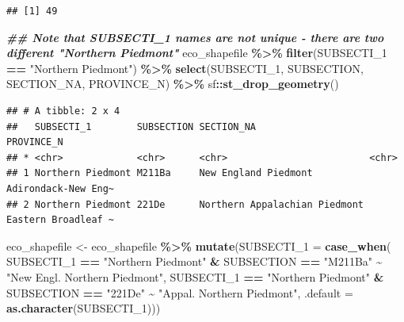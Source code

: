 \documentclass[
]{book}
\newenvironment{Shaded}{\begin{snugshade}}{\end{snugshade}}
\newcommand{\AttributeTok}[1]{\textcolor[rgb]{0.13,0.29,0.53}{#1}}
\newcommand{\DocumentationTok}[1]{\textcolor[rgb]{0.56,0.35,0.01}{\textbf{\textit{#1}}}}
\newcommand{\FunctionTok}[1]{\textcolor[rgb]{0.13,0.29,0.53}{\textbf{#1}}}
\newcommand{\NormalTok}[1]{#1}
\newcommand{\OtherTok}[1]{\textcolor[rgb]{0.56,0.35,0.01}{#1}}
\newcommand{\SpecialCharTok}[1]{\textcolor[rgb]{0.81,0.36,0.00}{\textbf{#1}}}
\newcommand{\StringTok}[1]{\textcolor[rgb]{0.31,0.60,0.02}{#1}}
\begin{document}
\begin{Shaded}
\end{Shaded}

\begin{verbatim}
## [1] 49
\end{verbatim}

\begin{Shaded}
\begin{Highlighting}[]
\DocumentationTok{\#\# Note that \textquotesingle{}SUBSECTI\_1\textquotesingle{} names are not unique {-} there are two different "Northern Piedmont"}
\NormalTok{eco\_shapefile }\SpecialCharTok{\%\textgreater{}\%}
  \FunctionTok{filter}\NormalTok{(SUBSECTI\_1 }\SpecialCharTok{==} \StringTok{"Northern Piedmont"}\NormalTok{) }\SpecialCharTok{\%\textgreater{}\%}
  \FunctionTok{select}\NormalTok{(SUBSECTI\_1, SUBSECTION, SECTION\_NA, PROVINCE\_N) }\SpecialCharTok{\%\textgreater{}\%}
\NormalTok{  sf}\SpecialCharTok{::}\FunctionTok{st\_drop\_geometry}\NormalTok{() }
\end{Highlighting}
\end{Shaded}

\begin{verbatim}
## # A tibble: 2 x 4
##   SUBSECTI_1        SUBSECTION SECTION_NA                    PROVINCE_N         
## * <chr>             <chr>      <chr>                         <chr>              
## 1 Northern Piedmont M211Ba     New England Piedmont          Adirondack-New Eng~
## 2 Northern Piedmont 221De      Northern Appalachian Piedmont Eastern Broadleaf ~
\end{verbatim}

\begin{Shaded}
\begin{Highlighting}[]
\NormalTok{eco\_shapefile }\OtherTok{\textless{}{-}}\NormalTok{ eco\_shapefile }\SpecialCharTok{\%\textgreater{}\%}
  \FunctionTok{mutate}\NormalTok{(}\AttributeTok{SUBSECTI\_1 =} \FunctionTok{case\_when}\NormalTok{(}
\NormalTok{    SUBSECTI\_1 }\SpecialCharTok{==} \StringTok{"Northern Piedmont"} \SpecialCharTok{\&}\NormalTok{ SUBSECTION }\SpecialCharTok{==} \StringTok{"M211Ba"} \SpecialCharTok{\textasciitilde{}} \StringTok{"New Engl. Northern Piedmont"}\NormalTok{,}
\NormalTok{    SUBSECTI\_1 }\SpecialCharTok{==} \StringTok{"Northern Piedmont"} \SpecialCharTok{\&}\NormalTok{ SUBSECTION }\SpecialCharTok{==} \StringTok{"221De"} \SpecialCharTok{\textasciitilde{}} \StringTok{"Appal. Northern Piedmont"}\NormalTok{,}
    \AttributeTok{.default =} \FunctionTok{as.character}\NormalTok{(SUBSECTI\_1)))}
\end{Highlighting}
\end{Shaded}
\end{document}
